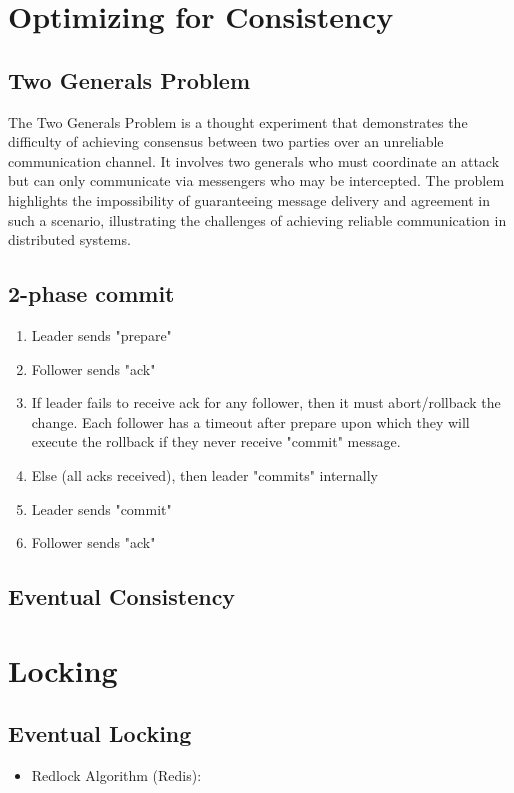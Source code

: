 \documentclass{article}
\begin{document}
\section{Optimizing for Consistency}
\subsection{Two Generals Problem}
The Two Generals Problem is a thought experiment that demonstrates the difficulty of achieving consensus between two parties over an unreliable communication channel. It involves two generals who must coordinate an attack but can only communicate via messengers who may be intercepted. The problem highlights the impossibility of guaranteeing message delivery and agreement in such a scenario, illustrating the challenges of achieving reliable communication in distributed systems.
\subsection{2-phase commit}
\begin{enumerate}
	\item Leader sends "prepare"
	\item Follower sends "ack"
	\item If leader fails to receive ack for any follower, then it must abort/rollback the change. Each follower has a timeout after prepare upon which they will execute the rollback if they never receive "commit" message.
	\item Else (all acks received), then leader "commits" internally
	\item Leader sends "commit"
	\item Follower sends "ack"
\end{enumerate}
\subsection{Eventual Consistency}
\section{Locking}
\subsection{Eventual Locking}
\begin{itemize}
	\item Redlock Algorithm (Redis):
\end{itemize}
\end{document}
